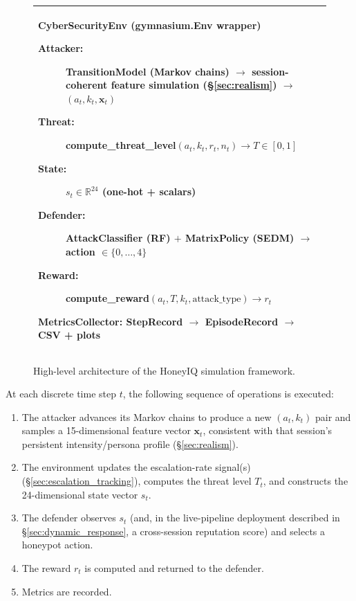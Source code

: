 \begin{figure}[ht]
  \centering
  \begin{tabular}{|p{}|}
    \hline
    \vspace{0.3cm}
    \textbf{CyberSecurityEnv} (gymnasium.Env wrapper)
    \begin{description}
      \item[Attacker:] TransitionModel (Markov chains) $\rightarrow$
            session-coherent feature simulation (\S\ref{sec:realism})
            $\rightarrow$ $(a_t, k_t, \mathbf{x}_t)$
      \item[Threat:] compute\_threat\_level$(a_t, k_t, r_t, n_t) \rightarrow T \in [0,1]$
      \item[State:] $s_t \in \mathbb{R}^{24}$ (one-hot + scalars)
      \item[Defender:] AttackClassifier (RF) $+$ MatrixPolicy (SEDM) $\rightarrow$ action $\in \{0,\ldots,4\}$
      \item[Reward:] compute\_reward$(a_t, T, k_t, \text{attack\_type}) \rightarrow r_t$
    \end{description}
    \vspace{0.1cm}
    \textbf{MetricsCollector}: StepRecord $\rightarrow$ EpisodeRecord $\rightarrow$ CSV + plots
    \vspace{0.3cm} \\
    \hline
  \end{tabular}
  \caption{High-level architecture of the HoneyIQ simulation framework.}
  \label{fig:architecture_text}
\end{figure}

At each discrete time step $t$, the following sequence of operations is
executed:
%
\begin{enumerate}
  \item The attacker advances its Markov chains to produce a new
        $(a_t, k_t)$ pair and samples a 15-dimensional feature vector
        $\mathbf{x}_t$, consistent with that session's persistent
        intensity/persona profile (\S\ref{sec:realism}).
  \item The environment updates the escalation-rate signal(s)
        (\S\ref{sec:escalation_tracking}), computes the threat level $T_t$,
        and constructs the 24-dimensional state vector $s_t$.
  \item The defender observes $s_t$ (and, in the live-pipeline deployment
        described in \S\ref{sec:dynamic_response}, a cross-session
        reputation score) and selects a honeypot action.
  \item The reward $r_t$ is computed and returned to the defender.
  \item Metrics are recorded.
\end{enumerate}

